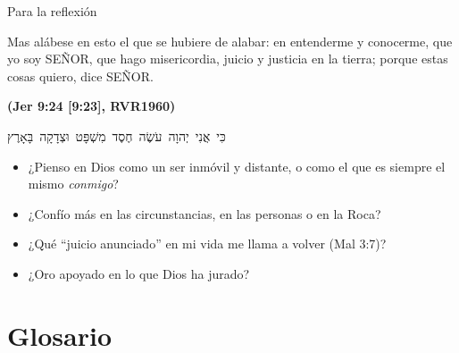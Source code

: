 \documentclass[hyperref={bookmarks=false},aspectratio=169]{beamer}
\newcommand{\heb}[1]{\mbox{\foreignlanguage{hebrew}{#1}}}
\newcommand{\SENOR}{S{\fontsize{0.78em}{1em}\selectfont EÑOR}}
\newcommand{\fuente}[1]{\par\hfill{\upshape\bfseries\footnotesize\textcolor{azul}{#1}}}
\begin{document}
\begin{frame}{Para la reflexión}
\begin{cita}Mas alábese en esto el que se hubiere de alabar: en entenderme y conocerme, que yo soy \SENOR, que hago misericordia, juicio y justicia en la tierra; porque estas cosas quiero, dice \SENOR.\fuente{(Jer 9:24 [9:23], RVR1960)}\end{cita}
\begin{center}\heb{כִּי אֲנִי יְהוָה עֹשֶׂה חֶסֶד מִשְׁפָּט וּצְדָקָה בָּאָרֶץ}\end{center}
\small
\begin{itemize}
\item ¿Pienso en Dios como un ser inmóvil y distante, o como el que es siempre el mismo \emph{conmigo}?
\item ¿Confío más en las circunstancias, en las personas o en la Roca?
\item ¿Qué ``juicio anunciado'' en mi vida me llama a volver (Mal 3:7)?
\item ¿Oro apoyado en lo que Dios ha jurado?
\end{itemize}
\end{frame}

\section{Glosario}
\end{document}
